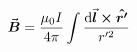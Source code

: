 

\vspace*{\fill}
\centering

\begin{align*}
    \va*{B} = \frac{\mu_0 I}{4 \pi} \int \frac{\dd{\va*{l}} \cross \vu*{r'}}{r'^2} 
\end{align*}

\centering
\vspace*{\fill}

